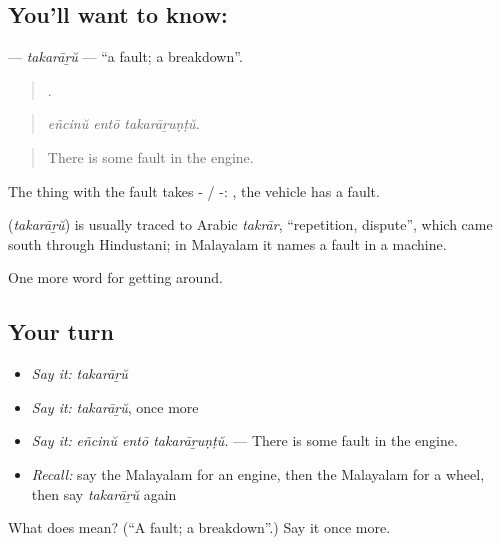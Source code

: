 \subsection*{You'll want to know: }
\textbf{} — \emph{takarāṟŭ} — \textquotedblleft{}a fault; a breakdown\textquotedblright{}.

\begin{quote}
  .
\end{quote}

\begin{quote}
\emph{eñcinŭ entō takarāṟuṇṭŭ.}
\end{quote}

\begin{quote}
There is some fault in the engine.
\end{quote}

The thing with the fault takes - / -:  , the vehicle has a fault.

\begin{cousinweb}
\textbf{} (\emph{takarāṟŭ}) is usually traced to Arabic \emph{takrār}, \textquotedblleft{}repetition, dispute\textquotedblright{}, which came south through Hindustani; in Malayalam it names a fault in a machine.
\end{cousinweb}

\begin{grammarlens}[title={What you've built}]
One more word for getting around.
\end{grammarlens}

\subsection*{Your turn}
\begin{itemize}
\raggedright
  \item \emph{Say it:} \emph{takarāṟŭ}
  \item \emph{Say it:} \emph{takarāṟŭ}, once more
  \item \emph{Say it:} \emph{eñcinŭ entō takarāṟuṇṭŭ.} — There is some fault in the engine.
  \item \emph{Recall:} say the Malayalam for an engine, then the Malayalam for a wheel, then say \emph{takarāṟŭ} again
\end{itemize}

\begin{tcolorbox}[breakable,colback=teal!4,colframe=teal!35!black,title={Before you move on}]
What does  mean? (\textquotedblleft{}A fault; a breakdown\textquotedblright{}.) Say it once more.
\end{tcolorbox}
